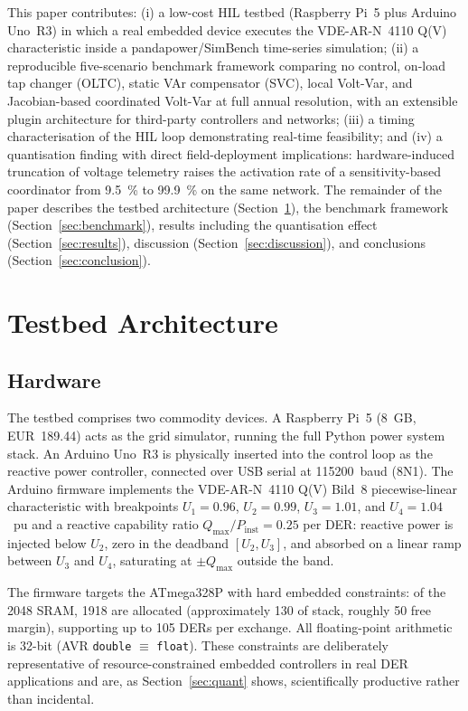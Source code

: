\documentclass[conference]{IEEEtran}
\begin{document}
This paper contributes: (i) a low-cost HIL testbed (Raspberry Pi~5 plus
Arduino Uno~R3) in which a real embedded device executes the
VDE-AR-N~4110 Q(V) characteristic inside a pandapower/SimBench time-series
simulation; (ii) a reproducible five-scenario benchmark framework
comparing no control, on-load tap changer (OLTC), static VAr compensator
(SVC), local Volt-Var, and Jacobian-based coordinated Volt-Var at full
annual resolution, with an extensible plugin architecture for
third-party controllers and networks; (iii) a timing characterisation of
the HIL loop demonstrating real-time feasibility; and (iv) a quantisation
finding with direct field-deployment implications: hardware-induced
truncation of voltage telemetry raises the activation rate of a
sensitivity-based coordinator from \SI{9.5}{\percent} to
\SI{99.9}{\percent} on the same network. The remainder of the paper
describes the testbed architecture (Section~\ref{sec:arch}), the
benchmark framework (Section~\ref{sec:benchmark}), results including the
quantisation effect (Section~\ref{sec:results}), discussion
(Section~\ref{sec:discussion}), and conclusions
(Section~\ref{sec:conclusion}).

\section{Testbed Architecture}
\label{sec:arch}

\subsection{Hardware}
\label{sec:hw}

The testbed comprises two commodity devices. A Raspberry Pi~5 (8~GB,
EUR~189.44) acts as the grid simulator, running the full Python power
system stack. An Arduino Uno~R3 is physically inserted into the control
loop as the reactive power controller, connected over USB serial at
\SI{115200}{baud} (8N1). The Arduino firmware implements the
VDE-AR-N~4110 Q(V) Bild~8 piecewise-linear characteristic with
breakpoints $U_1{=}0.96$, $U_2{=}0.99$, $U_3{=}1.01$, and $U_4{=}1.04$~pu
and a reactive capability ratio $Q_\mathrm{max}/P_\mathrm{inst} =
0.25$ per DER: reactive power is injected below $U_2$, zero in the
deadband $[U_2, U_3]$, and absorbed on a linear ramp between $U_3$ and
$U_4$, saturating at $\pm Q_\mathrm{max}$ outside the band.

The firmware targets the ATmega328P with hard embedded constraints: of
the \SI{2048}{\byte} SRAM, \SI{1918}{\byte} are allocated (approximately
\SI{130}{\byte} of stack, roughly \SI{50}{\byte} free margin), supporting
up to 105 DERs per exchange. All floating-point arithmetic is 32-bit
(AVR \texttt{double} $\equiv$ \texttt{float}). These constraints are
deliberately representative of resource-constrained embedded controllers
in real DER applications and are, as Section~\ref{sec:quant} shows,
scientifically productive rather than incidental.
\end{document}
